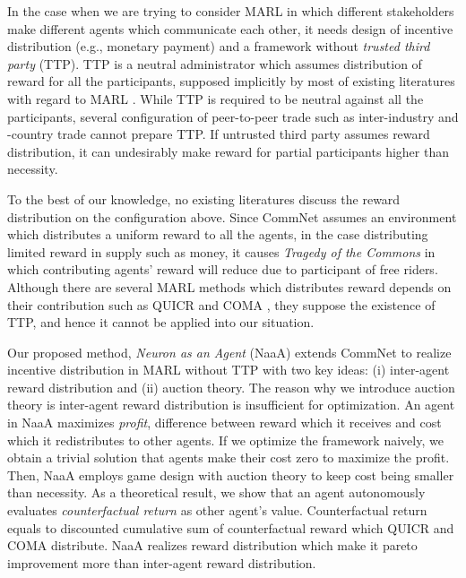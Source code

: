 In the case when we are trying to consider MARL in which different stakeholders make different agents which communicate each other, it needs design of incentive distribution (e.g., monetary payment) and a framework without {\em trusted third party} (TTP).
TTP \citep{wu1999game,sandholm2002possibility} is a neutral administrator which assumes distribution of reward for all the participants, supposed implicitly by most of existing literatures with regard to MARL \citep{agogino2006quicr,sukhbaatar2016learning,foerster2016learning,foerster2017counterfactual}.
While TTP is required to be neutral against all the participants,
several configuration of peer-to-peer trade such as inter-industry and -country trade cannot prepare TTP.
If untrusted third party assumes reward distribution, it can undesirably make reward for partial participants higher than necessity.

To the best of our knowledge, no existing literatures discuss the reward distribution on the configuration above.
Since CommNet assumes an environment which distributes a uniform reward to all the agents, 
in the case distributing limited reward in supply such as money, it causes {\em Tragedy of the Commons} \citep{lloyd1833two} in which contributing agents' reward will reduce due to participant of free riders.
Although there are several MARL methods which distributes reward depends on their contribution such as QUICR \citep{agogino2006quicr} and COMA \citep{sukhbaatar2016learning}, they suppose the existence of TTP, and hence it cannot be applied into our situation.


Our proposed method, {\em Neuron as an Agent} (NaaA) extends CommNet to realize incentive distribution
in MARL without TTP with two key ideas: (i) inter-agent reward distribution and (ii) auction theory.
The reason why we introduce auction theory is inter-agent reward distribution is insufficient for optimization.
An agent in NaaA maximizes {\em profit}, difference between reward which it receives and cost which it redistributes to other agents.
If we optimize the framework naively, we obtain a trivial solution that agents make their cost zero to maximize the profit.
Then, NaaA employs game design with auction theory to keep cost being smaller than necessity.
As a theoretical result, we show that an agent autonomously evaluates {\em counterfactual return} as other agent's value.
Counterfactual return equals to discounted cumulative sum of counterfactual reward \citep{agogino2006quicr} which QUICR and COMA distribute.
NaaA realizes reward distribution which make it pareto improvement more than inter-agent reward distribution.

